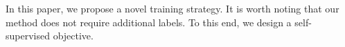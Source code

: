 In this paper, we propose a novel training strategy. It is worth noting that our method does not require additional labels. To this end, we design a self-supervised objective.
